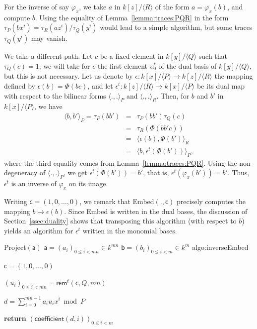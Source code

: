 \documentclass{sig-alternate}
\def\va {\ensuremath{\mathsf{a}}}
\def\vb {\ensuremath{\mathsf{b}}}
\def\vc {\ensuremath{\mathsf{c}}}
\def\rem {\ensuremath{\mathsf{rem}}}
\def\coeff {\ensuremath{\mathsf{coefficient}}}
\newcounter{algo}
\newenvironment{algorithm_endline}[4]{\small\begin{center}\begin{minipage}{0.48\textwidth}
      \refstepcounter{algo}
      \label{#4}
      \sf
      \rule{\textwidth}{0.2pt}\\
      \makebox[\textwidth][c]{Algorithm~\arabic{algo}:~\textbf{#1}}\\
      \rule[0.5\baselineskip]{\textwidth}{0.2pt}\\

      \vspace{-12pt}

      \parbox{\textwidth}{\textbf{Input} #2}
      \parbox{\textwidth}{\textbf{Output} #3}

\vspace{-7pt}

      \begin{enumerate*}}{\end{enumerate*}
      \vspace{-11pt}
      \rule{\textwidth}{0.2pt}
\end{minipage}\end{center}
}
\newcommand{\ang}[1]{\langle#1\rangle}
\begin{document}
For the inverse of say $\varphi_x$, we take $a$ in $k[z]/\langle R
\rangle$ of the form $a=\varphi_x(b)$, and compute $b$. Using the
equality of Lemma~\ref{lemma:traces:PQR} in the form $\tau_P(b x^i)
=\tau_R(a z^i)/\tau_Q(y^i)$ would lead to a simple algorithm, but some
traces $\tau_Q(y^i)$ may vanish. 

We take a different path. Let $c$ be a fixed element in $k[y]/\ang{Q}$
such that $\tau_Q(c)=1$; we will take for $c$ the first element
$\upsilon^\ast_0$ of the dual basis of $k[y]/\ang{Q}$, but this is not
necessary. Let us denote by $\epsilon: k[x]/\ang{P} \to k[z]/\ang{R}$
the mapping defined by $\epsilon(b) = \Phi(b c)$, and let $\epsilon^t:
k[z]/\ang{R} \to k[x]/\ang{P}$ be its dual map with respect to the
bilinear forms $\ang{.,.}_P$ and $\ang{.,.}_R$. Then, for $b$ and $b'$
in $k[x]/\ang{P}$, we have
\begin{eqnarray*}
\ang{b,b'}_P = \tau_P(b b') &=&  \tau_P(b b')\tau_Q(c) \\
&=& \tau_R( \Phi(b b' c))\\
&=& \ang{\epsilon(b), \Phi(b')}_R \\
&=& \ang{b, \epsilon^t(\Phi(b'))}_P,
\end{eqnarray*}
where the third equality comes from
Lemma~\ref{lemma:traces:PQR}. Using the non-degeneracy of
$\ang{.,.}_P$, we get $\epsilon^t(\Phi(b')) = b'$, that is,
$\epsilon^t(\varphi_x(b')) = b'$. Thus, $\epsilon^t$ is an inverse of
$\varphi_x$ on its image.

Writing $\vc=(1,0,\dots,0)$, we remark that {\sf Embed}$(.,\vc)$ precisely
computes the mapping $b\mapsto \epsilon(b)$. Since {\sf Embed} is written in
the dual bases, the discussion of Section~\ref{ssec:duality} shows
that transposing this algorithm (with respect to $b$) yields an
algorithm for $\epsilon^t$ written in the monomial bases. 

\begin{algofloat}[t]
\begin{algorithm_endline}
{Project$(\va)$}
{$\va=(a_i)_{0 \le i < mn} \in k^{mn}$}
{$\vb=(b_i)_{0 \le i < m} \in k^m$}
{algo:inverseEmbed}
\item $\vc=(1,0,\dots,0)$ 
\item  $(u_i)_{0\le i<mn} = \rem^t(\vc,Q,mn)$
\item \label{algo:inverseEmbed:dotprod} $d = \sum_{i=0}^{mn-1} a_i u_i x^i  \bmod P$
\item {\bf return} \label{algo:inverseEmbed:mod} $(\coeff(d,i))_{0 \le i < m}$
\end{algorithm_endline}
\vspace{-5ex}
\end{algofloat}
\end{document}
